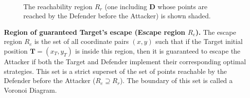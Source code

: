 \begin{figure}
\centering
{}\label{2_g<1}
\quad
{}\label{2_g=1}
\\
\label{2_g>1}
\caption{The reachability region $R_r$ (one including $\boldsymbol{D}$ whose points are reached by the Defender before the Attacker) is shown shaded.}
\label{Rr2}
\end{figure}

\textbf{Region of guaranteed Target's escape (Escape region $R_e$).} The escape region $R_e$ is the set of all coordinate pairs $(x,y)$ such that if the Target initial position $\boldsymbol{T}=(x_{T},y_{T})$ is inside this region, then it is guaranteed to escape the Attacker if both the Target and Defender implement their corresponding optimal strategies. This set is a strict superset of the set of points reachable by the Defender before the Attacker ($R_e\supseteq R_r$). The boundary of this set is called a Voronoi Diagram.

